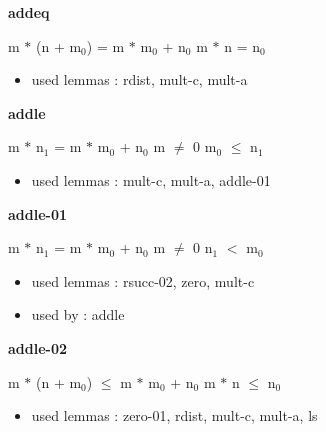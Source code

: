 \documentclass[a4paper]{article}
\begin{document}
\raggedright
              
\bigskip

{\large\bf addeq}

\medskip

 \Fol m $*$ (n + $\mbox{m}_{0}$) = m $*$ $\mbox{m}_{0}$ + $\mbox{n}_{0}$ \Equiv m $*$ n = $\mbox{n}_{0}$

\begin{itemize}


\item       used lemmas  : rdist, mult-c, mult-a

\end{itemize}

\medskip

\bigskip

{\large\bf addle}

\medskip

 \Fol m $*$ $\mbox{n}_{1}$ = m $*$ $\mbox{m}_{0}$ + $\mbox{n}_{0}$ \And m $\neq$ 0 \Imp $\mbox{m}_{0}$ $\le$ $\mbox{n}_{1}$

\begin{itemize}


\item       used lemmas  : mult-c, mult-a, addle-01

\end{itemize}

\medskip

\bigskip

{\large\bf addle-01}

\medskip

 \Fol m $*$ $\mbox{n}_{1}$ = m $*$ $\mbox{m}_{0}$ + $\mbox{n}_{0}$ \And m $\neq$ 0 \Imp \Not $\mbox{n}_{1}$ $<$ $\mbox{m}_{0}$

\begin{itemize}


\item       used lemmas  : rsucc-02, zero, mult-c
\item       used by      : addle

\end{itemize}

\medskip

\bigskip

{\large\bf addle-02}

\medskip

 \Fol m $*$ (n + $\mbox{m}_{0}$) $\le$ m $*$ $\mbox{m}_{0}$ + $\mbox{n}_{0}$ \Equiv m $*$ n $\le$ $\mbox{n}_{0}$

\begin{itemize}


\item       used lemmas  : zero-01, rdist, mult-c, mult-a, ls

\end{itemize}
\end{document}
